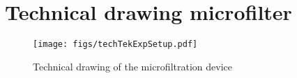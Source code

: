 \hyphenation{}
\chapter[Appendix: Technical drawing microfilter]%
{Technical drawing microfilter \label{ch:tech}}

\begin{figure}[H]
\centering
  \texttt{[image: figs/techTekExpSetup.pdf]}
  \caption{Technical drawing of the microfiltration device}
\end{figure}



% 
% 
% 
% 
%        
%     
%     
%     
%         
%        
